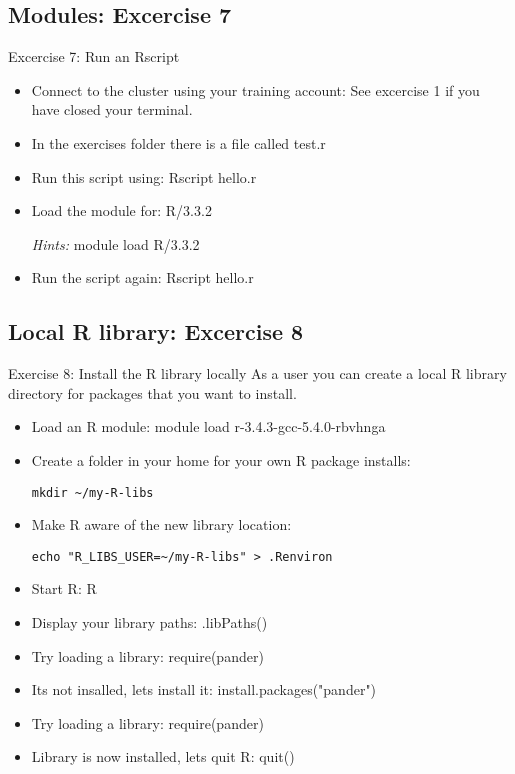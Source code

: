 \subsection{Modules: Excercise 7}
\begin{frame}[fragile]{Excercise 7: Run an Rscript}
\begin{itemize}
\item{Connect to the cluster using your training account: See excercise 1 if you have closed your terminal.}
\item{In the exercises folder there is a file called test.r}
\item{Run this script using: Rscript hello.r }
\item{Load the module for: R/3.3.2}
\item[\emph{Hints:}]{\alert{module load R/3.3.2}}
\item{Run the script again: Rscript hello.r}
\end{itemize}
\end{frame}

\subsection{Local R library: Excercise 8}
\begin{frame}[fragile]{Exercise 8: Install the R library locally}
As a user you can create a local R library directory for packages that you want to install. 

\begin{itemize}
\item Load an R module: 
module load r-3.4.3-gcc-5.4.0-rbvhnga
\item Create a folder in your home for your own R package installs:
\begin{verbatim}
mkdir ~/my-R-libs
\end{verbatim}
\item Make R aware of the new library location:
\begin{verbatim}
echo "R_LIBS_USER=~/my-R-libs" > .Renviron
\end{verbatim}
\item Start R:
R
\item Display your library paths:
.libPaths()
\item Try loading a library:
require(pander)
\item Its not insalled, lets install it:
install.packages("pander")
\item Try loading a library:
require(pander)
\item Library is now installed, lets quit R:
quit()
\end{itemize}
\end{frame}

